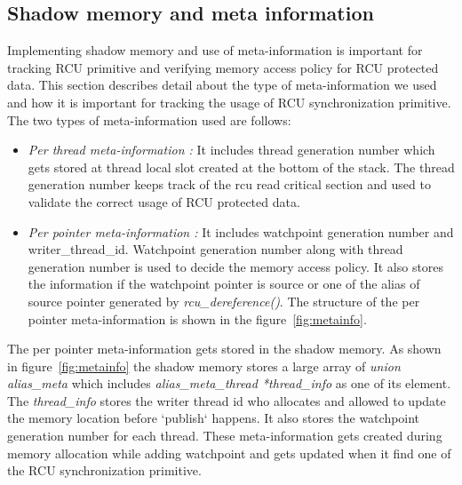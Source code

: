 \subsection{Shadow memory and meta information}
Implementing shadow memory and use of meta-information is important for tracking RCU primitive and verifying memory access policy for RCU protected data. This section describes detail about the type of meta-information we used and how it is important for tracking the usage of RCU synchronization primitive. The two types of meta-information used are follows: 
\begin{itemize}
 	\item \emph{Per thread meta-information :} It includes thread generation number which gets stored at thread local slot created at the bottom of the stack. The thread generation number keeps track of the rcu read critical section and used to validate the correct usage of RCU protected data.
   	\item \emph{Per pointer meta-information :} It includes watchpoint generation number and writer\_thread\_id.  Watchpoint generation number along with thread generation number is used to decide the memory access policy. It also stores the information if the watchpoint pointer is source or one of the alias of source pointer generated by \emph{rcu\_dereference()}. The structure of the per pointer meta-information is shown in the figure~\ref{fig:metainfo}. 
\end{itemize} 

The per pointer meta-information gets stored in the shadow memory. As shown in figure~\ref{fig:metainfo} the shadow memory stores a large array of \emph{union alias\_meta} which includes \emph{ alias\_meta\_thread *thread\_info} as one of its element. The \emph{thread\_info} stores the writer thread id who allocates and allowed to update the memory location before `publish` happens. It also stores the watchpoint generation number for each thread. These meta-information gets created during memory allocation while adding watchpoint and gets updated when it find one of the RCU synchronization primitive. 


